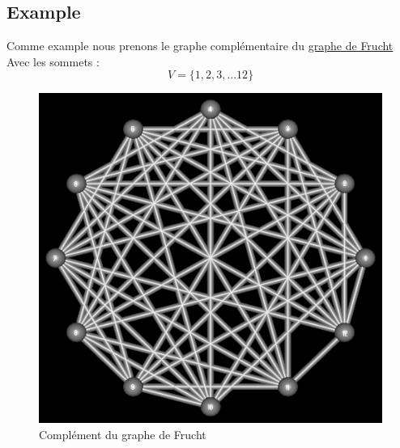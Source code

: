 \documentclass{article}
\begin{document}
\subsection{Example}
Comme example nous prenons le graphe complémentaire du \href{https://en.wikipedia.org/wiki/Frucht\_graph}{graphe de Frucht}
Avec les sommets :
\begin{displaymath}
  V=\{1,2,3,...12\}
\end{displaymath}
\begin{center}
  \begin{figure}[!htp]
    \caption{Complément du graphe de Frucht}
    \includegraphics[scale=0.7]{Report/frucht-compl.png}
  \end{figure}
\end{center}
\end{document}

